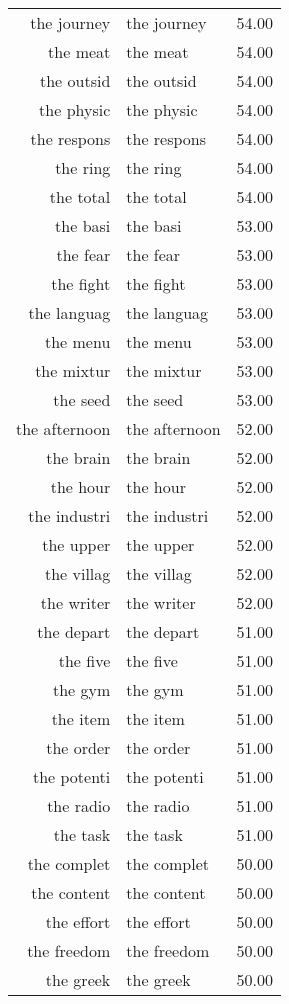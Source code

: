 \begin{table}[ht]
\begin{tabular}{rlr}
  the journey & the journey & 54.00 \\ 
  the meat & the meat & 54.00 \\ 
  the outsid & the outsid & 54.00 \\ 
  the physic & the physic & 54.00 \\ 
  the respons & the respons & 54.00 \\ 
  the ring & the ring & 54.00 \\ 
  the total & the total & 54.00 \\ 
  the basi & the basi & 53.00 \\ 
  the fear & the fear & 53.00 \\ 
  the fight & the fight & 53.00 \\ 
  the languag & the languag & 53.00 \\ 
  the menu & the menu & 53.00 \\ 
  the mixtur & the mixtur & 53.00 \\ 
  the seed & the seed & 53.00 \\ 
  the afternoon & the afternoon & 52.00 \\ 
  the brain & the brain & 52.00 \\ 
  the hour & the hour & 52.00 \\ 
  the industri & the industri & 52.00 \\ 
  the upper & the upper & 52.00 \\ 
  the villag & the villag & 52.00 \\ 
  the writer & the writer & 52.00 \\ 
  the depart & the depart & 51.00 \\ 
  the five & the five & 51.00 \\ 
  the gym & the gym & 51.00 \\ 
  the item & the item & 51.00 \\ 
  the order & the order & 51.00 \\ 
  the potenti & the potenti & 51.00 \\ 
  the radio & the radio & 51.00 \\ 
  the task & the task & 51.00 \\ 
  the complet & the complet & 50.00 \\ 
  the content & the content & 50.00 \\ 
  the effort & the effort & 50.00 \\ 
  the freedom & the freedom & 50.00 \\ 
  the greek & the greek & 50.00 \\ 

\end{tabular}
\end{table}
